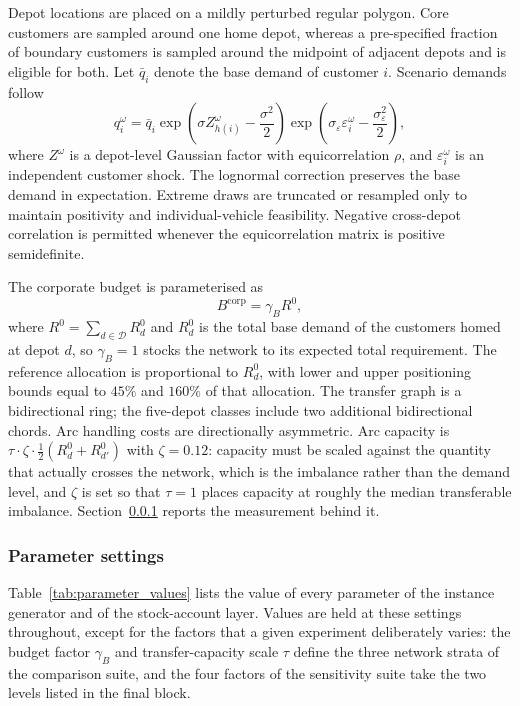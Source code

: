 \documentclass[authoryear,final,3p,times]{elsarticle}
\theoremstyle{definition}
\theoremstyle{plain}
\begin{document}
Depot locations are placed on a mildly perturbed regular polygon.  Core customers are sampled around one home depot, whereas a pre-specified fraction of boundary customers is sampled around the midpoint of adjacent depots and is eligible for both.  Let $\bar q_i$ denote the base demand of customer $i$.  Scenario demands follow
\begin{equation}
 q_i^\omega
 =\bar q_i
 \exp\!\left(\sigma Z_{h(i)}^\omega-\frac{\sigma^2}{2}\right)
 \exp\!\left(\sigma_\varepsilon\varepsilon_i^\omega-
                  \frac{\sigma_\varepsilon^2}{2}\right),
 \label{eq:scenario_generator}
\end{equation}
where $Z^\omega$ is a depot-level Gaussian factor with equicorrelation $\rho$, and $\varepsilon_i^\omega$ is an independent customer shock.  The lognormal correction preserves the base demand in expectation.  Extreme draws are truncated or resampled only to maintain positivity and individual-vehicle feasibility.  Negative cross-depot correlation is permitted whenever the equicorrelation matrix is positive semidefinite.

The corporate budget is parameterised as
\begin{equation}
 B^{\mathrm{corp}}=\gamma_B R^0,
 \label{eq:budget_stringency}
\end{equation}
where $R^0=\sum_{d\in\mathcal D}R^0_d$ and $R^0_d$ is the total base demand of the customers homed at depot $d$, so $\gamma_B=1$ stocks the network to its expected total requirement.  The reference allocation is proportional to $R^0_d$, with lower and upper positioning bounds equal to $45\%$ and $160\%$ of that allocation.  The transfer graph is a bidirectional ring; the five-depot classes include two additional bidirectional chords.  Arc handling costs are directionally asymmetric.  Arc capacity is $\tau\cdot\zeta\cdot\tfrac12(R^0_d+R^0_{d'})$ with $\zeta=0.12$: capacity must be scaled against the quantity that actually crosses the network, which is the imbalance rather than the demand level, and $\zeta$ is set so that $\tau=1$ places capacity at roughly the median transferable imbalance.  Section~\ref{subsubsec:parameter_settings} reports the measurement behind it.

\subsubsection{Parameter settings}
\label{subsubsec:parameter_settings}

Table~\ref{tab:parameter_values} lists the value of every parameter of the instance generator and of the stock-account layer.  Values are held at these settings throughout, except for the factors that a given experiment deliberately varies: the budget factor $\gamma_B$ and transfer-capacity scale $\tau$ define the three network strata of the comparison suite, and the four factors of the sensitivity suite take the two levels listed in the final block.
\end{document}
